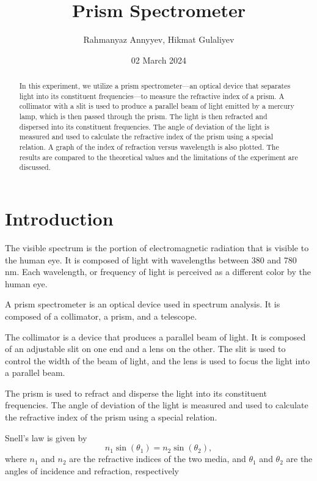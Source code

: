 \documentclass[10pt]{article}
\title{Prism Spectrometer}
\author{Rahmanyaz Annyyev, Hikmat Gulaliyev}
\date{02 March 2024}
\begin{document}
\maketitle

\begin{abstract}
In this experiment, we utilize a prism spectrometer---an optical device that separates light into its constituent frequencies---to measure the refractive index of a prism. A collimator with a slit is used to produce a parallel beam of light emitted by a mercury lamp, which is then passed through the prism. The light is then refracted and dispersed into its constituent frequencies. The angle of deviation of the light is measured and used to calculate the refractive index of the prism using a special relation. A graph of the index of refraction versus wavelength is also plotted. The results are compared to the theoretical values and the limitations of the experiment are discussed.
\end{abstract}

\section{Introduction}
The visible spectrum is the portion of electromagnetic radiation that is visible to the human eye. It is composed of light with wavelengths between 380 and 780 nm. Each wavelength, or frequency of light is perceived as a different color by the human eye\cite{Marcus_1998}. 


A prism spectrometer is an optical device used in spectrum analysis. It is composed of a collimator, a prism, and a telescope.

The collimator is a device that produces a parallel beam of light. It is composed of an adjustable slit on one end and a lens on the other. The slit is used to control the width of the beam of light, and the lens is used to focus the light into a parallel beam. 

The prism is used to refract and disperse the light into its constituent frequencies. The angle of deviation of the light is measured and used to calculate the refractive index of the prism using a special relation.

Snell's law is given by
\begin{equation}
    n_1 \sin(\theta_1) = n_2 \sin(\theta_2),
\end{equation}
where $n_1$ and $n_2$ are the refractive indices of the two media, and $\theta_1$ and $\theta_2$ are the angles of incidence and refraction, respectively
\end{document}
